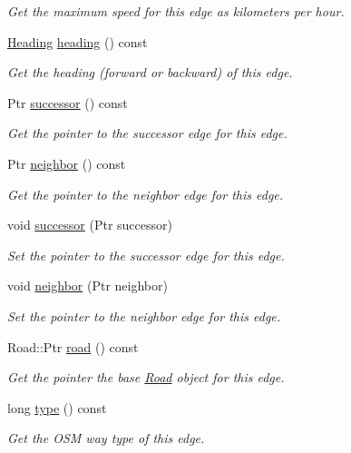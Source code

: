 \begin{DoxyCompactItemize}
\begin{DoxyCompactList}\small\item\em Get the maximum speed for this edge as kilometers per hour. \end{DoxyCompactList}\item 
\hyperlink{namespacegeo_ae7a495a59f07984a90e0b609bc038df9}{Heading} \hyperlink{classgeo_1_1Edge_a42070020fa7326a102316b7aab57801b}{heading} () const 
\begin{DoxyCompactList}\small\item\em Get the heading (forward or backward) of this edge. \end{DoxyCompactList}\item 
Ptr \hyperlink{classgeo_1_1Edge_aba1290f592ea2cd848fcb801f0562df2}{successor} () const 
\begin{DoxyCompactList}\small\item\em Get the pointer to the successor edge for this edge. \end{DoxyCompactList}\item 
Ptr \hyperlink{classgeo_1_1Edge_aad32f284aba317162ae6276497926268}{neighbor} () const 
\begin{DoxyCompactList}\small\item\em Get the pointer to the neighbor edge for this edge. \end{DoxyCompactList}\item 
void \hyperlink{classgeo_1_1Edge_a571ee74792a242715887d699a9486e53}{successor} (Ptr successor)
\begin{DoxyCompactList}\small\item\em Set the pointer to the successor edge for this edge. \end{DoxyCompactList}\item 
void \hyperlink{classgeo_1_1Edge_a001d13006bed7403a1ddf920a937bf4e}{neighbor} (Ptr neighbor)
\begin{DoxyCompactList}\small\item\em Set the pointer to the neighbor edge for this edge. \end{DoxyCompactList}\item 
Road\+::\+Ptr \hyperlink{classgeo_1_1Edge_a96fc3fb170d60c5eed77a4fb274f4741}{road} () const \hypertarget{classgeo_1_1Edge_a96fc3fb170d60c5eed77a4fb274f4741}{}\label{classgeo_1_1Edge_a96fc3fb170d60c5eed77a4fb274f4741}

\begin{DoxyCompactList}\small\item\em Get the pointer the base \hyperlink{classgeo_1_1Road}{Road} object for this edge. \end{DoxyCompactList}\item 
long \hyperlink{classgeo_1_1Edge_ad93db783fea4d5017739aba83a973acc}{type} () const 
\begin{DoxyCompactList}\small\item\em Get the O\+SM way type of this edge. \end{DoxyCompactList}\end{DoxyCompactItemize}
